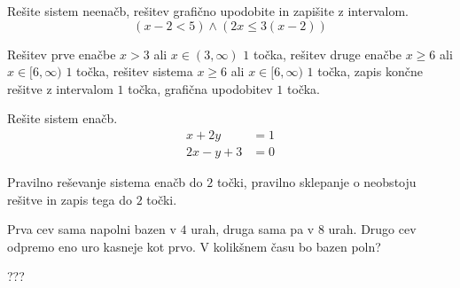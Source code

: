 \documentclass[addpoints]{exam}
\begin{document}
\begin{questions}
    \newpage

    \question[5]
    Rešite sistem neenačb, rešitev grafično upodobite in zapišite z intervalom.
    $$ \left(x-2<5\right)\land\left(2x\leq 3(x-2)\right) $$
    
    
    \begin{solution}[11cm]
        Rešitev prve enačbe $x>3$ ali $x\in(3,\infty)$ $1$ točka, rešitev druge enačbe $x\geq 6$ ali $x\in[6,\infty)$ $1$ točka, rešitev sistema $x\geq 6$ ali $x\in[6,\infty)$ $1$ točka, zapis končne rešitve z intervalom $1$ točka, grafična upodobitev $1$ točka.
    \end{solution}


    \question[4]
    Rešite sistem enačb.
    $$ \begin{aligned}
        x+2y&=1 \\ 2x-y+3&=0
    \end{aligned} $$
    
    
    \begin{solution}[8cm]
        Pravilno reševanje sistema enačb do $2$ točki, pravilno sklepanje o neobstoju rešitve in zapis tega do $2$ točki.
    \end{solution}


\newpage

    \question[4]
    Prva cev sama napolni bazen v $4$ urah, druga sama pa v $8$ urah. Drugo cev odpremo eno uro kasneje kot prvo.
    V kolikšnem času bo bazen poln?
    
    
    \begin{solution}[10cm]
        ???
    \end{solution}





    
    
    
    




\end{questions}
\end{document}
